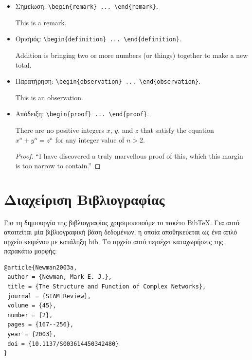 \begin{itemize}
	\item Σημείωση: \verb|\begin{remark} ... \end{remark}|.

	\begin{remark}
		This is a remark.
	\end{remark}

	\item Ορισμός: \verb|\begin{definition} ... \end{definition}|.

	\begin{definition}
		Addition is bringing two or more numbers (or things) together to make a new total.
	\end{definition}

	\item Παρατήρηση: \verb|\begin{observation} ... \end{observation}|.

	\begin{observation}
		This is an observation.
	\end{observation}

	\item Aπόδειξη: \verb|\begin{proof} ... \end{proof}|.

	\begin{theorem}
		There are no positive integers $x$, $y$, and $z$ that satisfy the equation $x^{n} + y^{n} = z^{n}$ for any integer value of $n > 2$.
	\end{theorem}
	\begin{proof}
		``I have discovered a truly marvellous proof of this, which this margin is too narrow to contain.''
	\end{proof}
\end{itemize}


\section{Διαχείριση Βιβλιογραφίας}
\label{sec:Bibliography}
Για τη δημιουργία της βιβλιογραφίας χρησιμοποιούμε το πακέτο BibTeX.
Για αυτό απαιτείται μία βιβλιογραφική βάση δεδομένων, η οποία αποθηκεύεται ως ένα απλό αρχείο κειμένου με κατάληξη bib.
Το αρχείο αυτό περιέχει καταχωρήσεις της παρακάτω μορφής:

\begin{verbatim}
@article{Newman2003a,
 author = {Newman, Mark E. J.},
 title = {The Structure and Function of Complex Networks},
 journal = {SIAM Review},
 volume = {45},
 number = {2},
 pages = {167--256},
 year = {2003},
 doi = {10.1137/S003614450342480}
}
\end{verbatim}

